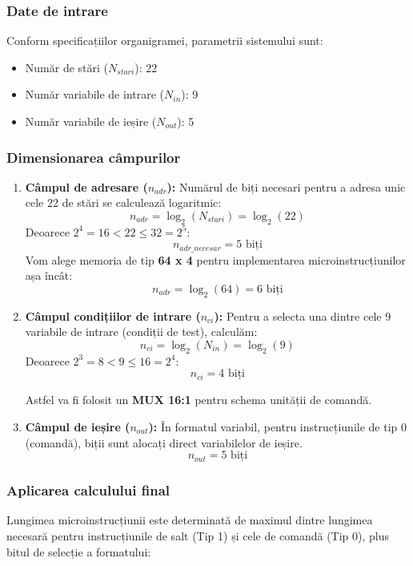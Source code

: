 \subsubsection{Date de intrare}
Conform specificațiilor organigramei, parametrii sistemului sunt:
\begin{itemize}
    \item Număr de stări ($N_{stari}$): 22
    \item Număr variabile de intrare ($N_{in}$): 9
    \item Număr variabile de ieșire ($N_{out}$): 5
\end{itemize}

\subsubsection{Dimensionarea câmpurilor}

\begin{enumerate}
    \item \textbf{Câmpul de adresare ($n_{adr}$):}
    Numărul de biți necesari pentru a adresa unic cele 22 de stări se calculează logaritmic:
    \[
    n_{adr} = \log_2(N_{stari}) = \log_2(22)
    \]
    Deoarece $2^4 = 16 < 22 \leq 32 = 2^5$:
    \[
    n_{adr\_necesar} = 5 \text{ biți}
    \]
  Vom alege memoria de tip \textbf{64 x 4} pentru implementarea microinstrucțiunilor așa încât:
    \[
    n_{adr} = \log_2(64) = 6 \text{ biți}
    \]

    \item \textbf{Câmpul condițiilor de intrare ($n_{ci}$):}
    Pentru a selecta una dintre cele 9 variabile de intrare (condiții de test), calculăm:
    \[
    n_{ci} = \log_2(N_{in}) = \log_2(9)
    \]
    Deoarece $2^3 = 8 < 9 \leq 16 = 2^4$:
    \[
    n_{ci} = 4 \text{ biți}
    \]

    Astfel va fi folosit un \textbf{MUX 16:1} pentru schema unității de comandă.

    \item \textbf{Câmpul de ieșire ($n_{out}$):}
    În formatul variabil, pentru instrucțiunile de tip 0 (comandă), biții sunt alocați direct variabilelor de ieșire.
    \[
    n_{out} = 5 \text{ biți}
    \]
\end{enumerate}

\subsubsection{Aplicarea calculului final}

Lungimea microinstrucțiunii este determinată de maximul dintre lungimea necesară pentru instrucțiunile de salt (Tip 1) și cele de comandă (Tip 0), plus bitul de selecție a formatului:

